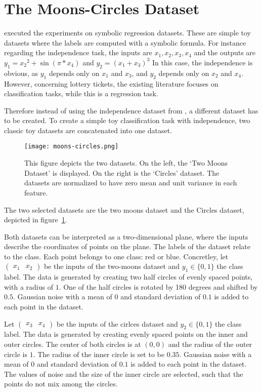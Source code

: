 \section{The Moons-Circles Dataset}\label{sec:independece_dataset}
\textcite{BIMT} executed the experiments on symbolic regression datasets.
These are simple toy datasets where the labels are computed with a symbolic formula. 
For instance regarding the independence task, the inputs are $x_1, x_2, x_3, x_4$ and the outputs are $y_1={x_2}^2 + \sin{(\pi*x_4)}$ and $y_2={(x_1+x_3)}^3$
In this case, the independence is obvious, as $y_1$ depends only on $x_1$ and $x_3$, and $y_2$ depends only on $x_2$ and $x_4$.
However, concerning lottery tickets, the existing literature focuses on classification tasks, while this is a regression task.

Therefore instead of using the independence dataset from \autocite{BIMT}, a different dataset has to be created.
To create a simple toy classification task with independence, two classic toy datasets are concatenated into one dataset.

\begin{figure}[ht]
    \centering
    \texttt{[image: moons-circles.png]}
    \caption{
        This figure depicts the two datasets. 
        On the left, the `Two Moons Dataset' is displayed. 
        On the right is the `Circles' dataset. 
        The datasets are normalized to have zero mean and unit variance in each feature.
    }\label{fig:moons_circles}
\end{figure}

The two selected datasets are the two moons dataset and the Circles dataset, depicted in figure~\ref{fig:moons_circles}.

Both datasets can be interpreted as a two-dimensional plane, where the inputs describe the coordinates of points on the plane. 
The labels of the dataset relate to the class.
Each point belongs to one class: red or blue.
Concretley, let $\begin{pmatrix} x_1 & x_2 \end{pmatrix}$ be the inputs of the two-moons dataset and $y_1 \in \{0,1\}$ the class label.
The data is generated by creating two half circles of evenly spaced points, with a radius of $1$.
One of the half circles is rotated by 180 degrees and shifted by $0.5$.
Gaussian noise with a mean of $0$ and standard deviation of $0.1$ is added to each point in the dataset.

Let $\begin{pmatrix} x_3 & x_4 \end{pmatrix}$ be the inputs of the cirlces dataset and $y_2 \in \{0,1\}$ the class label.
The data is generated by creating evenly spaced points on the inner and outer circles. 
The center of both circles is at $(0,0)$ and the radius of the outer circle is $1$.
The radius of the inner circle is set to be $0.35$.
Gaussian noise with a mean of $0$ and standard deviation of $0.1$ is added to each point in the dataset.
The values of noise and the size of the inner circle are selected, such that the points do not mix among the circles.

